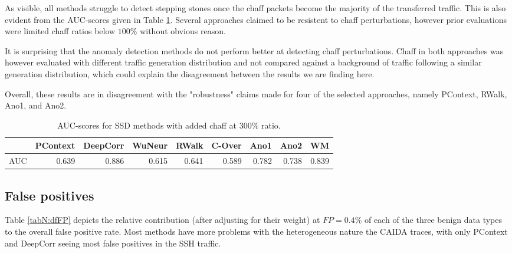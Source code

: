 As visible, all methods struggle to detect stepping stones once the chaff packets become the majority of the transferred traffic. This is also evident from the AUC-scores given in Table \ref{tabN:AUCchaff}. Several approaches claimed to be resistent to chaff perturbations, however prior evaluations were limited chaff ratios below $100\%$ without obvious reason.

It is surprising that the anomaly detection methods do not perform better at detecting chaff perturbations. Chaff in both approaches was however evaluated with different traffic generation distribution and not compared against a background of traffic following a similar generation distribution, which could explain the disagreement between the results we are finding here.


Overall, these results are in disagreement with the "robustness" claims made for four of the selected approaches, namely PContext, RWalk, Ano1, and Ano2.

\begin{table}
\centering
\small
\begin{tabular}{l|r|r|r|r|r|r|r|r}
  \hline
 & PContext & DeepCorr & WuNeur & RWalk & C-Over & Ano1 & Ano2 & WM \\ 
  \hline
AUC & 0.639 & 0.886 & 0.615 & 0.641 & 0.589 & 0.782 & 0.738 & 0.839 \\ 
   \hline
\end{tabular}

\caption{AUC-scores for SSD methods with added chaff at 300\% ratio.}\label{tabN:AUCchaff}
\vspace{-0.7cm}
\end{table}

\subsection{False positives}\label{SecN:FPana}

Table \ref{tabN:dfFP} depicts the relative contribution (after adjusting for their weight) at $FP=0.4\%$ of each of the three benign data types to the overall false positive rate. Most methods have more problems with the heterogeneous nature the CAIDA traces, with only PContext and DeepCorr seeing most false positives in the SSH traffic. 

